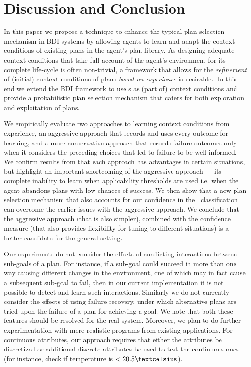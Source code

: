 \section{Discussion and Conclusion}\label{sec:discussion}

In this paper we propose a technique to enhance the typical plan selection
mechanism in BDI systems by allowing agents to learn and adapt the context
conditions of existing plans in the agent's plan library.
As designing adequate context conditions that take full account of the agent's
environment for its complete life-cycle is often non-trivial, a framework that
allows for the \emph{refinement} of (initial) context conditions of plans
\textit{based on experience} is desirable. To this end we extend the BDI
framework to use \dt{}s as (part of) context conditions and provide a
probabilistic plan selection mechanism that caters for both exploration and
exploitation of plans.


We empirically evaluate two approaches to learning context conditions from experience, an aggressive approach that records and uses every outcome for learning, and a more conservative approach that records failure outcomes only when it considers the preceding choices that led to failure to be well-informed.
We confirm results from \cite{APSS08} that each approach has advantages in certain situations, but highlight an important shortcoming of the aggressive approach --- its complete inability to learn when applicability thresholds are used i.e. when the agent abandons plans with low chances of success. We then show that a new plan selection mechanism that also accounts for our confidence in the \dt\ classification can overcome the earlier issues with the aggressive approach. We conclude that the aggressive approach (that is also simpler), combined with the confidence measure (that also provides flexibility for tuning to different situations) is a better candidate for the general setting.

Our experiments do not consider the effects of conflicting interactions between sub-goals of a plan. For instance, if a sub-goal could succeed in more than one way causing different changes in the environment, one of which may in fact cause a subsequent sub-goal to fail, then in our current implementation it is not possible to detect and learn such interactions. Similarly we do not currently consider the effects of using failure recovery, under which alternative plans are tried upon the failure of a plan for achieving a goal. We note that both these features should be resolved for the real system. Moreover, we plan to do further experimentation with more realistic programs from existing applications. For continuous attributes, our approach requires that either the attributes be discretized or additional discrete attributes be used to test the continuous ones (for instance, check if temperature is $<20.5\textcelsius$).

